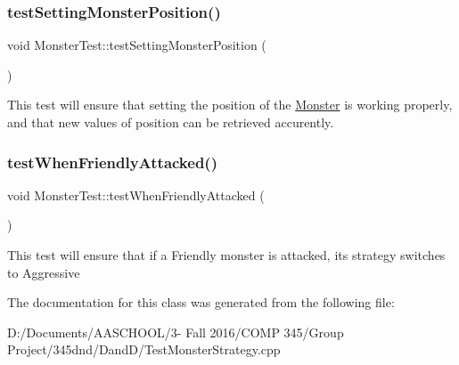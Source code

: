 \subsubsection{\texorpdfstring{test\+Setting\+Monster\+Position()}{testSettingMonsterPosition()}}
{\footnotesize\ttfamily void Monster\+Test\+::test\+Setting\+Monster\+Position (\begin{DoxyParamCaption}{ }\end{DoxyParamCaption})\hspace{0.3cm}{\ttfamily [protected]}}

This test will ensure that setting the position of the \hyperlink{class_monster}{Monster} is working properly, and that new values of position can be retrieved accurently. \hypertarget{class_monster_test_a311fafa951a5c78813e7f98a1144c30d}{}\label{class_monster_test_a311fafa951a5c78813e7f98a1144c30d} 
\subsubsection{\texorpdfstring{test\+When\+Friendly\+Attacked()}{testWhenFriendlyAttacked()}}
{\footnotesize\ttfamily void Monster\+Test\+::test\+When\+Friendly\+Attacked (\begin{DoxyParamCaption}{ }\end{DoxyParamCaption})\hspace{0.3cm}{\ttfamily [protected]}}

This test will ensure that if a Friendly monster is attacked, its strategy switches to Aggressive 

The documentation for this class was generated from the following file\+:\begin{DoxyCompactItemize}
\item 
D\+:/\+Documents/\+A\+A\+S\+C\+H\+O\+O\+L/3-\/ Fall 2016/\+C\+O\+M\+P 345/\+Group Project/345dnd/\+Dand\+D/Test\+Monster\+Strategy.\+cpp\end{DoxyCompactItemize}
